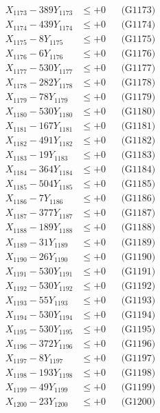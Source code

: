 \documentclass[a4paper,10pt]{article}
\begin{document}
{\begin{align}
X_{1173} - 389Y_{1173} &\leq +0 && \text{(G1173)} \\
X_{1174} - 439Y_{1174} &\leq +0 && \text{(G1174)} \\
X_{1175} - 8Y_{1175} &\leq +0 && \text{(G1175)} \\
X_{1176} - 6Y_{1176} &\leq +0 && \text{(G1176)} \\
X_{1177} - 530Y_{1177} &\leq +0 && \text{(G1177)} \\
X_{1178} - 282Y_{1178} &\leq +0 && \text{(G1178)} \\
X_{1179} - 78Y_{1179} &\leq +0 && \text{(G1179)} \\
X_{1180} - 530Y_{1180} &\leq +0 && \text{(G1180)} \\
\allowbreak
X_{1181} - 167Y_{1181} &\leq +0 && \text{(G1181)} \\
X_{1182} - 491Y_{1182} &\leq +0 && \text{(G1182)} \\
X_{1183} - 19Y_{1183} &\leq +0 && \text{(G1183)} \\
X_{1184} - 364Y_{1184} &\leq +0 && \text{(G1184)} \\
X_{1185} - 504Y_{1185} &\leq +0 && \text{(G1185)} \\
X_{1186} - 7Y_{1186} &\leq +0 && \text{(G1186)} \\
X_{1187} - 377Y_{1187} &\leq +0 && \text{(G1187)} \\
X_{1188} - 189Y_{1188} &\leq +0 && \text{(G1188)} \\
X_{1189} - 31Y_{1189} &\leq +0 && \text{(G1189)} \\
X_{1190} - 26Y_{1190} &\leq +0 && \text{(G1190)} \\
\allowbreak
X_{1191} - 530Y_{1191} &\leq +0 && \text{(G1191)} \\
X_{1192} - 530Y_{1192} &\leq +0 && \text{(G1192)} \\
X_{1193} - 55Y_{1193} &\leq +0 && \text{(G1193)} \\
X_{1194} - 530Y_{1194} &\leq +0 && \text{(G1194)} \\
X_{1195} - 530Y_{1195} &\leq +0 && \text{(G1195)} \\
X_{1196} - 372Y_{1196} &\leq +0 && \text{(G1196)} \\
X_{1197} - 8Y_{1197} &\leq +0 && \text{(G1197)} \\
X_{1198} - 193Y_{1198} &\leq +0 && \text{(G1198)} \\
X_{1199} - 49Y_{1199} &\leq +0 && \text{(G1199)} \\
X_{1200} - 23Y_{1200} &\leq +0 && \text{(G1200)} \\

\end{align}}
\end{document}
